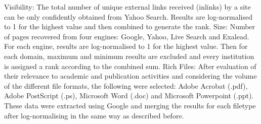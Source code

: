 Visibility: The total number of unique external links received (inlinks) by a site can be only confidently obtained from Yahoo Search. Results are log-normalised to 1 for the highest value and
then combined to generate the rank.
Size: Number of pages recovered from four engines: Google, Yahoo, Live Search and Exalead. For each engine, results are log-normalised to 1 for the highest value. Then for each domain, maximum
and minimum results are excluded and every institution is assigned a rank according to the combined sum.
Rich Files: After evaluation of their relevance to academic and publication activities and considering the volume of the different file formats, the following were selected: Adobe Acrobat (.pdf), Adobe PostScript (.ps), Microsoft Word (.doc) and Microsoft Powerpoint (.ppt). These data were extracted using Google and merging the results for each filetype after log-normalising in the same way as described before.
